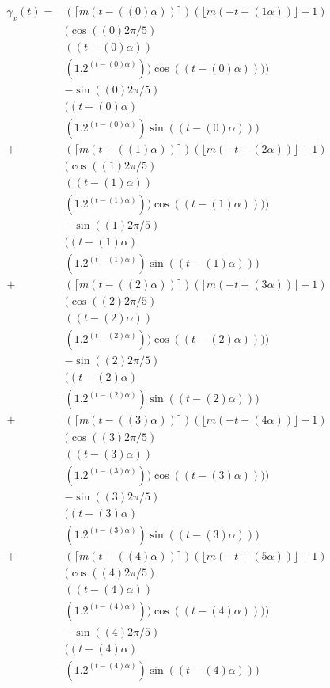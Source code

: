 \documentclass[a4paper,10pt]{article}
\begin{document}
\begin{equation}
\begin{split}
\gamma_x(t) = &(\lceil m(t - ((0)\alpha)) \rceil)(\lfloor m(-t + (1\alpha)) \rfloor + 1) \\
			&( \cos((0)2\pi/5)\\
			&((t-(0)\alpha))\\
			&(1.2^{(t-(0)\alpha)}))\cos((t-(0)\alpha))))\\ 
			&- \sin((0)2\pi/5)\\
			&((t-(0)\alpha)\\
			&(1.2^{(t-(0)\alpha)})\sin((t-(0)\alpha)))\\
		+	&(\lceil m(t - ((1)\alpha)) \rceil)(\lfloor m(-t + (2\alpha)) \rfloor + 1) \\
			&( \cos((1)2\pi/5)\\
			&((t-(1)\alpha))\\
			&(1.2^{(t-(1)\alpha)}))\cos((t-(1)\alpha))))\\ 
			&- \sin((1)2\pi/5)\\
			&((t-(1)\alpha)\\
			&(1.2^{(t-(1)\alpha)})\sin((t-(1)\alpha)))\\						
		+	&(\lceil m(t - ((2)\alpha)) \rceil)(\lfloor m(-t + (3\alpha)) \rfloor + 1) \\
			&( \cos((2)2\pi/5)\\
			&((t-(2)\alpha))\\
			&(1.2^{(t-(2)\alpha)}))\cos((t-(2)\alpha))))\\ 
			&- \sin((2)2\pi/5)\\
			&((t-(2)\alpha)\\
			&(1.2^{(t-(2)\alpha)})\sin((t-(2)\alpha)))\\			
		+	&(\lceil m(t - ((3)\alpha)) \rceil)(\lfloor m(-t + (4\alpha)) \rfloor + 1) \\
			&( \cos((3)2\pi/5)\\
			&((t-(3)\alpha))\\
			&(1.2^{(t-(3)\alpha)}))\cos((t-(3)\alpha))))\\ 
			&- \sin((3)2\pi/5)\\
			&((t-(3)\alpha)\\
			&(1.2^{(t-(3)\alpha)})\sin((t-(3)\alpha)))\\			
		+	&(\lceil m(t - ((4)\alpha)) \rceil)(\lfloor m(-t + (5\alpha)) \rfloor + 1) \\
			&( \cos((4)2\pi/5)\\
			&((t-(4)\alpha))\\
			&(1.2^{(t-(4)\alpha)}))\cos((t-(4)\alpha))))\\ 
			&- \sin((4)2\pi/5)\\
			&((t-(4)\alpha)\\
			&(1.2^{(t-(4)\alpha)})\sin((t-(4)\alpha)))\\			
\end{split}
\end{equation}
\end{document}
